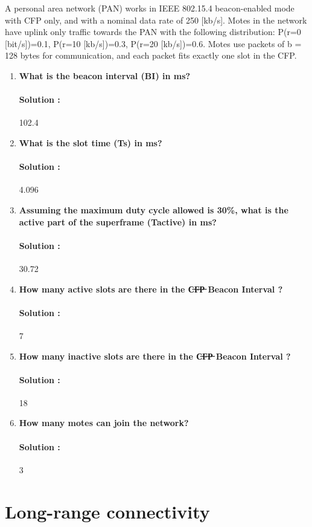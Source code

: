 \documentclass{article}
\begin{document}
A personal area network (PAN)  works in IEEE 802.15.4 beacon-enabled mode with CFP only, and with a nominal data rate of 250 [kb/s]. Motes in the network have uplink only traffic towards the PAN with the following distribution: P(r=0 [bit/s])=0.1,  P(r=10 [kb/s])=0.3, P(r=20 [kb/s])=0.6. Motes use packets of b = 128 bytes for communication, and each packet fits exactly one slot in the CFP.

\begin{enumerate}
    \item \textbf{What is the beacon interval (BI) in ms?}
    \paragraph{Solution :} 102.4
    \item \textbf{What is the slot time (Ts) in ms?}
    \paragraph{Solution :} 4.096
    \item \textbf{Assuming the maximum duty cycle allowed is 30\%, what is the active part of the superframe (Tactive) in ms?}
    \paragraph{Solution :} 30.72
    \item \textbf{How many active slots are there in the C̶F̶P̶ Beacon Interval ?}
    \paragraph{Solution :} 7
    \item \textbf{How many inactive slots are there in the C̶F̶P̶ Beacon Interval ?}
    \paragraph{Solution :} 18
    \item \textbf{How many motes can join the network?}
    \paragraph{Solution :} 3
    
\end{enumerate}

\newpage

\section{Long-range connectivity}
\end{document}
